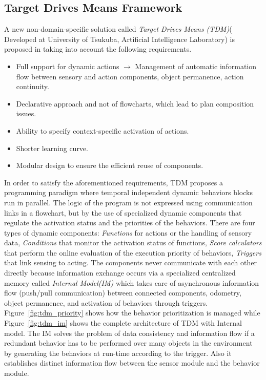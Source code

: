{\subsection{Target Drives Means Framework}
A new non-domain-specific solution called \emph{Target Drives Means (TDM)}( Developed at University of Tsukuba, Artificial Intelligence Laboratory) is proposed in \cite{berenz2014targets} taking into account the following requirements. 
\begin{itemize}
\item Full support for dynamic actions $\rightarrow$ Management of automatic information flow between sensory and action components, object permanence, action continuity.
\item Declarative approach and not of flowcharts, which lead to plan composition issues. 
\item Ability to specify context-specific activation of actions. 
\item Shorter learning curve. 
\item Modular design to ensure the efficient reuse
of components.
\end{itemize}
In order to satisfy the aforementioned requirements, TDM proposes a programming paradigm where temporal independent dynamic behaviors blocks run in parallel. The logic of the program is not expressed using communication links in a flowchart, but by the use of specialized dynamic components that regulate the activation status and the priorities of the behaviors. There are four types of dynamic components: \emph{Functions} for actions or the handling of sensory data, \emph{Conditions} that monitor the activation status of functions, \emph{Score calculators} that perform the online evaluation of the execution priority of behaviors, \emph{Triggers} that link sensing to acting. The components never communicate with each other directly because information exchange occurs via a specialized centralized memory called \emph{Internal Model(IM)} which takes care of asynchronous information flow (push/pull communication) between connected components, odometry, object permanence, and activation of behaviors through triggers. Figure~\ref{fig:tdm_priority} shows how the behavior prioritization is managed while Figure~\ref{fig:tdm_im} shows the complete architecture of TDM with Internal model. The IM solves the problem of data consistency and information flow if a redundant behavior has to be performed over many objects in the environment by generating the behaviors at run-time according to the trigger. Also it establishes distinct information flow between the sensor module and the behavior module.
}

